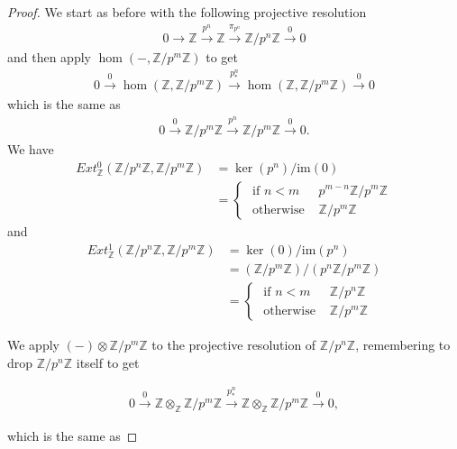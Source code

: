 \documentclass[12pt]{extarticle}
\newcommand{\im}{\text{im}}
\newcommand{\Z}{\mathbb{Z}}
\newcommand{\<}{\langle}
\renewcommand{\>}{\rangle}
\theoremstyle{definition}
\begin{document}
\begin{proof}
  We start as before with the following projective resolution
  \begin{align*}
    0 \to \Z \xrightarrow{p^n} \Z \xrightarrow{\pi_{p^n}} \Z/p^n\Z \xrightarrow{0} 0 
  \end{align*}
  and then apply $\hom(-, \Z/p^m\Z)$ to get
  \begin{align*}
    0 \xrightarrow{0} \hom(\Z, \Z/p^m\Z) \xrightarrow{p^n_*} \hom(\Z, \Z/p^m\Z) \xrightarrow{0} 0
  \end{align*}
  which is the same as
  \begin{align*}
    0 \xrightarrow{0} \Z/p^m\Z \xrightarrow{p^n} \Z/p^m \Z \xrightarrow{0} 0.
  \end{align*}
  We have
  \begin{align*}
    Ext_{\Z}^0(\Z/p^n\Z, \Z/p^m\Z)
    &= \ker(p^n)/\im(0) \\
    &= 
    \begin{cases}
      \text{ if } n<m & p^{m-n}\Z/ p^m \Z \\
      \text{ otherwise } & \Z / p^m \Z
    \end{cases}
  \end{align*}
  and
  \begin{align*}
    Ext_{\Z}^1(\Z/p^n\Z, \Z/p^m\Z) &= \ker(0)/\im(p^n) \\
    &= (\Z/p^m \Z)/(p^n \Z / p^m \Z) \\
    &=
    \begin{cases}
      \text{ if } n<m & \Z/ p^n \Z \\
      \text{ otherwise } & \Z / p^m \Z
    \end{cases}
  \end{align*}

  We apply $(-) \otimes \Z/p^m\Z$ to the projective resolution of $\Z/p^n\Z$, remembering to drop $\Z/p^n \Z$ itself to get

  \begin{align*}
    0 \xrightarrow{0} \Z \otimes_{\Z} \Z/p^m\Z \xrightarrow{p^n_*} \Z \otimes_{\Z} \Z/p^m\Z \xrightarrow{0} 0 ,
  \end{align*}

  which is the same as


\end{proof}
\end{document}

